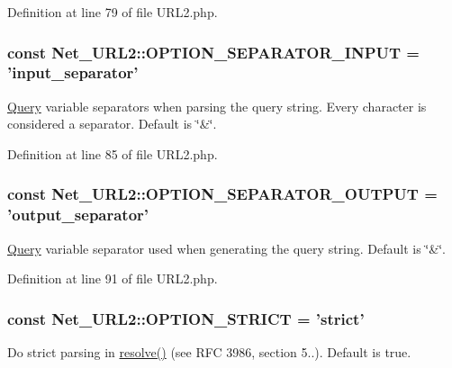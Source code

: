 Definition at line 79 of file U\-R\-L2.\-php.

\hypertarget{classNet__URL2_af5b6f766fae9600b3938e33c32893bce}{
\subsubsection[{O\-P\-T\-I\-O\-N\-\_\-\-S\-E\-P\-A\-R\-A\-T\-O\-R\-\_\-\-I\-N\-P\-U\-T}]{\setlength{\rightskip}{0pt plus 5cm}const Net\-\_\-\-U\-R\-L2\-::\-O\-P\-T\-I\-O\-N\-\_\-\-S\-E\-P\-A\-R\-A\-T\-O\-R\-\_\-\-I\-N\-P\-U\-T = 'input\-\_\-separator'}}\label{classNet__URL2_af5b6f766fae9600b3938e33c32893bce}
\hyperlink{classQuery}{Query} variable separators when parsing the query string. Every character is considered a separator. Default is \char`\"{}\&\char`\"{}. 

Definition at line 85 of file U\-R\-L2.\-php.

\hypertarget{classNet__URL2_a84719f522747f51638a9c8474d4abc39}{
\subsubsection[{O\-P\-T\-I\-O\-N\-\_\-\-S\-E\-P\-A\-R\-A\-T\-O\-R\-\_\-\-O\-U\-T\-P\-U\-T}]{\setlength{\rightskip}{0pt plus 5cm}const Net\-\_\-\-U\-R\-L2\-::\-O\-P\-T\-I\-O\-N\-\_\-\-S\-E\-P\-A\-R\-A\-T\-O\-R\-\_\-\-O\-U\-T\-P\-U\-T = 'output\-\_\-separator'}}\label{classNet__URL2_a84719f522747f51638a9c8474d4abc39}
\hyperlink{classQuery}{Query} variable separator used when generating the query string. Default is \char`\"{}\&\char`\"{}. 

Definition at line 91 of file U\-R\-L2.\-php.

\hypertarget{classNet__URL2_a766955033bdccec7175d0694df62a1a9}{
\subsubsection[{O\-P\-T\-I\-O\-N\-\_\-\-S\-T\-R\-I\-C\-T}]{\setlength{\rightskip}{0pt plus 5cm}const Net\-\_\-\-U\-R\-L2\-::\-O\-P\-T\-I\-O\-N\-\_\-\-S\-T\-R\-I\-C\-T = 'strict'}}\label{classNet__URL2_a766955033bdccec7175d0694df62a1a9}
Do strict parsing in \hyperlink{classNet__URL2_a8630ab79fad624b2fd5b0df2e9123c0a}{resolve()} (see R\-F\-C 3986, section 5..). Default is true. 

